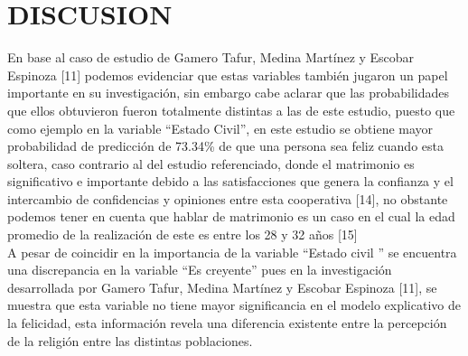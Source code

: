 \documentclass[conference]{IEEEtran}
\begin{document}
\section{DISCUSION} 

En base al caso de estudio de  Gamero Tafur, Medina Martínez y Escobar Espinoza [11] podemos evidenciar que estas variables también jugaron un papel importante en su investigación, sin embargo cabe aclarar que las probabilidades que ellos obtuvieron fueron totalmente distintas a las de este estudio, puesto que como ejemplo en la variable “Estado Civil”, en este estudio se obtiene mayor probabilidad de predicción de 73.34\% de que una persona sea feliz cuando esta soltera, caso contrario al del estudio referenciado, donde el matrimonio es significativo e importante debido a las satisfacciones que genera la confianza y el intercambio de confidencias y opiniones entre esta cooperativa [14], no obstante podemos tener en cuenta que hablar de matrimonio es un caso en el cual la edad promedio de la realización de este es entre los 28 y 32 años [15] \\

A pesar de coincidir en la importancia de  la variable “Estado civil ” se encuentra una discrepancia en la variable “Es creyente”  pues en la investigación desarrollada por Gamero Tafur, Medina Martínez y Escobar Espinoza [11], se muestra que esta variable no tiene mayor significancia en el modelo explicativo de la felicidad, esta información revela una  diferencia existente entre la percepción de la religión entre las  distintas poblaciones.\\
\end{document}
